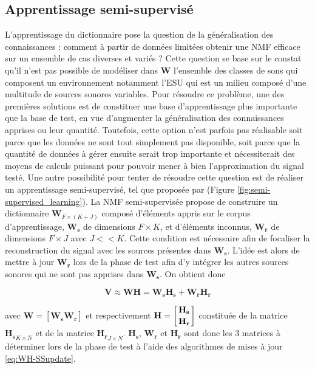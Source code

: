 \subsection{Apprentissage semi-supervisé}
L'apprentissage du dictionnaire pose la question de la généralisation des connaissances : comment à partir de données limitées obtenir une NMF efficace sur un ensemble de cas diverses et variés ?  Cette question se base sur le constat qu'il n'est pas possible de modéliser dans $\mathbf{W}$ l'ensemble des classes de sons qui composent un environnement notamment l'ESU qui est un milieu composé d'une multitude de sources sonores variables. Pour résoudre ce problème, une des premières solutions est de constituer une base d'apprentissage plus importante que la base de test, en vue d'augmenter la généralisation des connaissances apprises ou leur quantité. Toutefois, cette option n'est parfois pas réalisable soit parce que les données ne sont tout simplement pas disponible, soit parce que la quantité de données à gérer ensuite serait trop importante et nécessiterait des moyens de calculs puissant pour pouvoir mener à bien l'approximation du signal testé.
Une autre possibilité pour tenter de résoudre cette question est de réaliser un apprentissage semi-supervisé, tel que proposée par \cite{lee_semi-supervised_2010, smaragdis2007supervised} (Figure \ref{fig:semi-supervised_learning}). La NMF semi-supervisée propose de construire un dictionnaire $\mathbf{W}_{F \times (K+J)}$ composé d'éléments appris sur le corpus d'apprentissage, $\mathbf{W_s} $ de dimensions $F \times K$, et d'éléments inconnus, $\mathbf{W_r}$ de dimensions $F \times J$ avec $J << K$. Cette condition est nécessaire afin de focaliser la reconstruction du signal avec les sources présentes dans $\mathbf{W_s}$. L'idée est alors de mettre à jour $\mathbf{W_r}$ lors de la phase de test afin d'y intégrer les autres sources sonores qui ne sont pas apprises dans $\mathbf{W_s}$. On obtient donc

\begin{equation}
\mathbf{V} \approx \mathbf{WH} = \mathbf{W_s} \mathbf{H_s} + \mathbf{W_r} \mathbf{H_r}
\end{equation}


avec $\mathbf{W} = \left[ \mathbf{W_s} \mathbf{W_r} \right]$ et respectivement $\mathbf{H} = \left[ \genfrac{}{}{0pt}{0}{\mathbf{H_s}}{\mathbf{H_r}} \right]$ constituée de la matrice $\mathbf{H_s}_{K \times N}$ et de la matrice $\mathbf{H_r}_{J \times N}$. $\mathbf{H_s}$, $\mathbf{W_r}$ et $\mathbf{H_r}$ sont donc les 3 matrices à déterminer lors de la phase de test à l'aide des algorithmes de mises à jour \ref{eq:WH-SSupdate}. 

